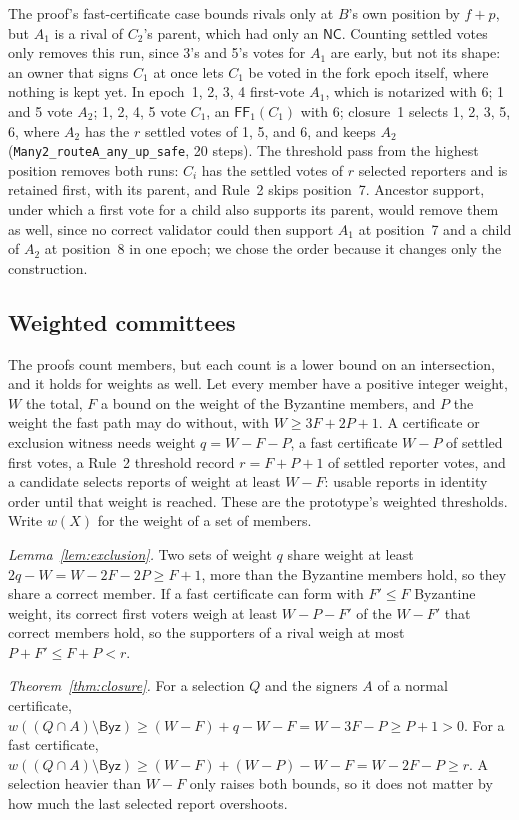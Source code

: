 \documentclass[conference]{IEEEtran}
\newcommand{\NC}{\mathsf{NC}}
\newcommand{\FF}{\mathsf{FF}}
\newcommand{\Byz}{\mathsf{Byz}}
\begin{document}
The proof's fast-certificate case bounds rivals only at $B$'s own position by $f+p$, but $A_1$ is a rival of $C_2$'s parent, which had only an $\NC$. Counting settled votes only removes this run, since 3's and 5's votes for $A_1$ are early, but not its shape: an owner that signs $C_1$ at once lets $C_1$ be voted in the fork epoch itself, where nothing is kept yet. In epoch~1, 2, 3, 4 first-vote $A_1$, which is notarized with 6; 1 and 5 vote $A_2$; 1, 2, 4, 5 vote $C_1$, an $\FF_1(C_1)$ with 6; closure~1 selects 1, 2, 3, 5, 6, where $A_2$ has the $r$ settled votes of 1, 5, and 6, and keeps $A_2$ (\texttt{Many2\_routeA\_any\_up\_safe}, 20 steps). The threshold pass from the highest position removes both runs: $C_i$ has the settled votes of $r$ selected reporters and is retained first, with its parent, and Rule~2 skips position~7. Ancestor support, under which a first vote for a child also supports its parent, would remove them as well, since no correct validator could then support $A_1$ at position~7 and a child of $A_2$ at position~8 in one epoch; we chose the order because it changes only the construction.

\subsection{Weighted committees}
\label{app:weights}
The proofs count members, but each count is a lower bound on an intersection, and it holds for weights as well. Let every member have a positive integer weight, $W$ the total, $F$ a bound on the weight of the Byzantine members, and $P$ the weight the fast path may do without, with $W\ge3F+2P+1$. A certificate or exclusion witness needs weight $q=W-F-P$, a fast certificate $W-P$ of settled first votes, a Rule~2 threshold record $r=F+P+1$ of settled reporter votes, and a candidate selects reports of weight at least $W-F$: usable reports in identity order until that weight is reached. These are the prototype's weighted thresholds. Write $w(X)$ for the weight of a set of members.

\emph{Lemma~\ref{lem:exclusion}.} Two sets of weight $q$ share weight at least $2q-W=W-2F-2P\ge F+1$, more than the Byzantine members hold, so they share a correct member. If a fast certificate can form with $F'\le F$ Byzantine weight, its correct first voters weigh at least $W-P-F'$ of the $W-F'$ that correct members hold, so the supporters of a rival weigh at most $P+F'\le F+P<r$.

\emph{Theorem~\ref{thm:closure}.} For a selection $Q$ and the signers $A$ of a normal certificate, $w((Q\cap A)\setminus\Byz)\ge(W-F)+q-W-F=W-3F-P\ge P+1>0$. For a fast certificate, $w((Q\cap A)\setminus\Byz)\ge(W-F)+(W-P)-W-F=W-2F-P\ge r$. A selection heavier than $W-F$ only raises both bounds, so it does not matter by how much the last selected report overshoots.
\end{document}

